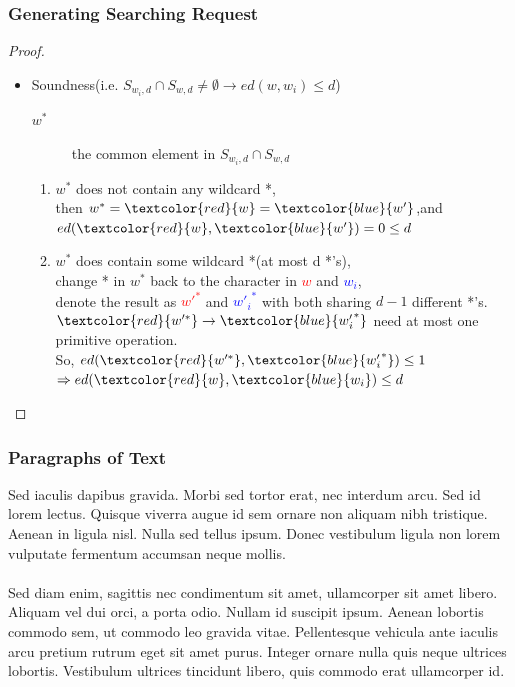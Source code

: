 \documentclass{beamer}
\begin{document}
\begin{frame}
	\frametitle{Generating Searching Request}
	\begin{proof}
		\begin{itemize}
			\item Soundness(i.e. ${S_{{w_i},d}} \cap {S_{w,d}} \ne \emptyset  \to ed(w,{w_i}) \le d$) \\
			\begin{description}
				\item[${w^*}$]the common element in ${S_{{w_i},d}} \cap {S_{w,d}}$
			\end{description}
			\begin{enumerate}
				\item ${w^*}$ does not contain any wildcard *,\\
				then ${w^*} =\textcolor{red}{ w} =\textcolor{blue}{ w'}$,and $ed(\textcolor{red}{w},\textcolor{blue}{w'}) = 0 \le d$
				\item ${w^*}$ does contain some wildcard *(at most d *'s),\\
				change * in $w^*$ back to the character in \textcolor{red}{$w$} and \textcolor{blue}{$w_i$},\\
				denote the result as \textcolor{red}{$w{'^*}$} and \textcolor{blue}{$w{'_i}^*$} with both sharing $d-1$ different *'s.\\
				$\textcolor{red}{w{'^*}} \to \textcolor{blue}{w{'_i}^*}$ need at most one primitive operation.\\
				So, $ed(\textcolor{red}{w{'^*}},\textcolor{blue}{w{'_i}^*}) \le 1$\\
				$ \Rightarrow ed(\textcolor{red}{w},\textcolor{blue}{{w_i}}) \le d$
				
			\end{enumerate}
		\end{itemize}
	\end{proof}
\end{frame}
\begin{frame}
\frametitle{Paragraphs of Text}
Sed iaculis dapibus gravida. Morbi sed tortor erat, nec interdum arcu. Sed id lorem lectus. Quisque viverra augue id sem ornare non aliquam nibh tristique. Aenean in ligula nisl. Nulla sed tellus ipsum. Donec vestibulum ligula non lorem vulputate fermentum accumsan neque mollis.\\~\\

Sed diam enim, sagittis nec condimentum sit amet, ullamcorper sit amet libero. Aliquam vel dui orci, a porta odio. Nullam id suscipit ipsum. Aenean lobortis commodo sem, ut commodo leo gravida vitae. Pellentesque vehicula ante iaculis arcu pretium rutrum eget sit amet purus. Integer ornare nulla quis neque ultrices lobortis. Vestibulum ultrices tincidunt libero, quis commodo erat ullamcorper id.
\end{frame}
\end{document}
